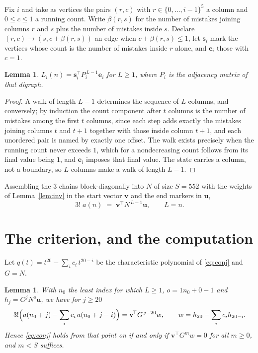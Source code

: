 \documentclass[11pt,a4paper]{article}
\theoremstyle{plain}
\newtheorem{lemma}[theorem]{Lemma}
\theoremstyle{definition}
\begin{document}
Fix $i$ and take as vertices the pairs $(r,c)$ with $r\in\{0,\dots,i-1\}^{5}$ a column
and $0\le c\le1$ a running count. Write $\beta(r,s)$ for the number of mistakes joining
columns $r$ and $s$ plus the number of mistakes inside $s$. Declare $(r,c)\to(s,c+\beta(r,s))$
an edge when $c+\beta(r,s)\le1$, let $\mathbf{s}_i$ mark the vertices whose count is the
number of mistakes inside $r$ alone, and $\mathbf{e}_i$ those with $c=1$.

\begin{lemma}\label{lem:walk}
$L_i(n)=\mathbf{s}_i^{\!\top}P_i^{\,L-1}\mathbf{e}_i$ for $L\ge1$, where $P_i$ is the
adjacency matrix of that digraph.
\end{lemma}

\begin{proof}
A walk of length $L-1$ determines the sequence of $L$ columns, and conversely; by induction
the count component after $t$ columns is the number of mistakes among the first $t$ columns,
since each step adds exactly the mistakes joining columns $t$ and $t+1$ together with those
inside column $t+1$, and each unordered pair is named by exactly one offset. The walk exists
precisely when the running count never exceeds $1$, which for a nondecreasing count follows
from its final value being $1$, and $\mathbf{e}_i$ imposes that final value. The state
carries a column, not a boundary, so $L$ columns make a walk of length $L-1$.
\end{proof}

Assembling the $3$ chains block-diagonally into $N$ of size $S=552$ with the weights of
Lemma~\ref{lem:inv} in the start vector $\mathbf{v}$ and the end markers in
$\mathbf{u}$,
\begin{equation}\label{eq:walk2}
3!\;a(n)\;=\;\mathbf{v}^{\!\top}N^{\,L-1}\mathbf{u},\qquad L=n .
\end{equation}

\section{The criterion, and the computation}

Let $q(t)=t^{20}-\sum_i c_i\,t^{20-i}$ be the characteristic polynomial of
\eqref{eq:conj} and $G=N$.

\begin{lemma}\label{lem:crit}
With $n_0$ the least index for which $L\ge1$, $o=1n_0+0-1$ and
$h_j=G^{j}N^{o}\mathbf{u}$, we have for $j\ge20$
\[
3!\Bigl(a(n_0+j)-\sum_i c_i\,a(n_0+j-i)\Bigr)=\mathbf{v}^{\!\top}G^{\,j-20}w,
\qquad w=h_{20}-\sum_i c_ih_{20-i} .
\]
Hence \eqref{eq:conj} holds from that point on if and only if
$\mathbf{v}^{\!\top}G^{m}w=0$ for all $m\ge0$, and $m<S$ suffices.
\end{lemma}
\end{document}
